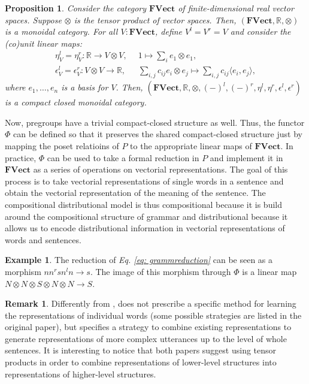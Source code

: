 \documentclass[11pt,a4paper,openright,twoside]{report}
\newcounter{mycounter}
\theoremstyle{plain}
\newtheorem{proposition}[mycounter]{Proposition}
\theoremstyle{definition}
\newtheorem{remark}[mycounter]{Remark}
\newtheorem{example}[mycounter]{Example}
\begin{document}
\begin{proposition}
  Consider the category $\mathbf{FVect}$ of finite-dimensional real vector spaces. Suppose $\otimes$ is the tensor product of vector spaces. Then, $(\mathbf{FVect}, \mathbb{R}, \otimes)$ is a monoidal category.  
  For all $V: \mathbf{FVect}$, define $V^l = V^r = V$ and consider the (co)unit linear maps:
  \begin{align*}
    \eta_V^l = \eta_V^r: \mathbb{R} \to V \otimes V, \,\,\, &1 \mapsto \sum_i e_1 \otimes e_1,\\
    \epsilon_V^l = \epsilon_V^r: V \otimes V \to \mathbb{R}, \,\,\, &\sum_{i,j} c_{ij} e_i \otimes e_j \mapsto \sum_{i,j} c_{ij} \langle e_i, e_j \rangle,
  \end{align*}
  where $e_1, \dots, e_n$ is a basis for $V$. Then, $(\mathbf{FVect}, \mathbb{R}, \otimes, (-)^l, (-)^r, \eta^l, \eta^r, \epsilon^l, \epsilon^r)$ is a compact closed monoidal category.
\end{proposition}

Now, pregroups have a trivial compact-closed structure as well. Thus, the functor $\Phi$ can be defined so that it preserves the shared compact-closed structure just by mapping the poset relatioins of $P$ to the appropriate linear maps of $\mathbf{FVect}$. In practice, $\Phi$ can be used to take a formal reduction in $P$ and implement it in $\mathbf{FVect}$ as a series of operations on vectorial representations. The goal of this process is to take vectorial representations of single words in a sentence and obtain the vectorial representation of the meaning of the sentence. The compositional distributional model is thus compositional because it is build around the compositional structure of grammar and distributional because it allows us to encode distributional information in vectorial representations of words and sentences.

\begin{example}
  The reduction of \textit{Eq. \ref{eq: grammreduction}} can be seen as a morphism $nn^rsn^ln \to s$. The image of this morphism through $\Phi$ is a linear map 
  $N \otimes N \otimes S \otimes N \otimes N \to S.$
\end{example}

\begin{remark}
  Differently from \cite{sheshmani2021categorical}, \cite{coecke2010mathematical} does not prescribe a specific method for learning the representations of individual words (some possible strategies are listed in the original paper), but specifies a strategy to combine existing representations to generate representations of more complex utterances up to the level of whole sentences. It is interesting to notice that both papers suggest using tensor products in order to combine representations of lower-level structures into representations of higher-level structures.
\end{remark}
\end{document}
